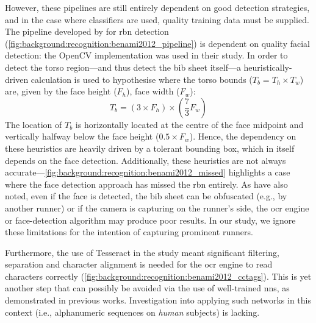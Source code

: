 However, these pipelines are still entirely dependent on good detection strategies, and in the case where classifiers are used, quality training data must be supplied. The pipeline developed by \citet{Benami:2012jf} for \gls{rbn} detection (\cref{fig:background:recognition:benami2012_pipeline}) is dependent on quality facial detection: the OpenCV implementation \citep{Lienhart:2002uo} was used in their study. In order to detect the torso region---and thus detect the bib sheet itself---a heuristically-driven calculation is used to hypothesise where the torso bounds ($T_{b} = T_{h} \times T_{w}$) are, given by the face height ($F_{h}$), face width ($F_{w}$):
\begin{equation*}
  T_{b} = (3 \times F_{h}) \times (\frac{7}{3} F_{w})
\end{equation*}
The location of $T_{b}$ is horizontally located at the centre of the face midpoint and vertically halfway below the face height ($0.5 \times F_{w}$). Hence, the dependency on these heuristics are heavily driven by a tolerant bounding box, which in itself depends on the face detection. Additionally, these heuristics are not always accurate---\cref{fig:background:recognition:benami2012_missed} highlights a case where the face detection approach has missed the \gls{rbn} entirely. As \citet{Fu:2015by} have also noted, even if the face is detected, the bib sheet can be obfuscated (e.g., by another runner) or if the camera is capturing on the runner's side, the \gls{ocr} engine or face-detection algorithm may produce poor results. In our study, we ignore these limitations for the intention of capturing prominent runners.

Furthermore, the use of Tesseract in the study meant significant filtering, separation and character alignment is needed for the \gls{ocr} engine to read characters correctly (\cref{fig:background:recognition:benami2012_cctags}). This is yet another step that can possibly be avoided via the use of well-trained \glspl{nn}, as demonstrated in previous works. Investigation into applying such networks in this context (i.e., alphanumeric sequences on \textit{human} subjects) is lacking.

\vspace*{\fill}


